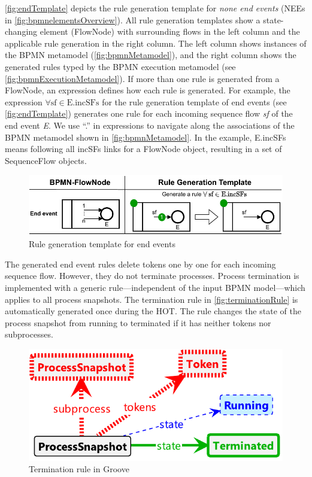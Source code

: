 \documentclass{lmcs} %
\begin{document}
\autoref{fig:endTemplate} depicts the rule generation template for \textit{none end events} (\textsf{NEE}s in \autoref{fig:bpmnelementsOverview}).
All rule generation templates show a state-changing element (\textsf{FlowNode}) with surrounding flows in the left column and the applicable rule generation in the right column.
The left column shows instances of the BPMN metamodel (\autoref{fig:bpmnMetamodel}), and the right column shows the generated rules typed by the BPMN execution metamodel (see \autoref{fig:bpmnExecutionMetamodel}).
If more than one rule is generated from a \textsf{FlowNode}, an expression defines how each rule is generated.
For example, the expression $\forall \text{sf} \in \text{E.incSFs}$ for the rule generation template of end events (see \autoref{fig:endTemplate}) generates one rule for each incoming sequence flow \textit{sf} of the end event \textit{E}.
We use ``.'' in expressions to navigate along the associations of the BPMN metamodel shown in \autoref{fig:bpmnMetamodel}.
In the example, \textsf{E.incSFs} means following all \textsf{incSFs} links for a \textsf{FlowNode} object, resulting in a set of \textsf{SequenceFlow} objects.

\begin{figure}[ht]
    \centering
    \includegraphics[width=.8\textwidth]{images/end_template.pdf}
    \caption{Rule generation template for end events}
    \label{fig:endTemplate}
\end{figure}
    
The generated end event rules delete tokens one by one for each incoming sequence flow.
However, they do not terminate processes.
Process termination is implemented with a generic rule---independent of the input BPMN model---which applies to all process snapshots.
The termination rule in \autoref{fig:terminationRule} is automatically generated once during the HOT.
The rule changes the state of the process snapshot from running to terminated if it has neither tokens nor subprocesses.

\begin{figure}[ht]
    \centering
    \includegraphics[width=.45\textwidth]{images/Terminate.pdf}
    \caption{Termination rule in Groove}
    \label{fig:terminationRule}
\end{figure}
\end{document}
